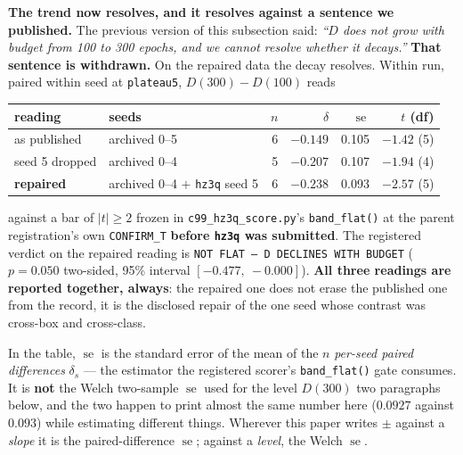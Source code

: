 \documentclass[10pt,letterpaper]{article}
\newcommand{\Dstat}{D}                         %
\newcommand{\plateau}{\texttt{plateau5}}
\newcommand{\arm}[1]{\texttt{#1}}
\DeclareMathOperator{\se}{se}
\begin{document}
\textbf{The trend now resolves, and it resolves against a sentence we published.} The previous
version of this subsection said: \emph{``$\Dstat$ does not grow with budget from 100 to 300
epochs, and we cannot resolve whether it decays.''} \textbf{That sentence is withdrawn.} On the
repaired data the decay resolves. Within run, paired within seed at \plateau{},
$\Dstat(300) - \Dstat(100)$ reads

\begin{center}
\small
\begin{tabular}{@{}llrrrr@{}}
\toprule
reading & seeds & $n$ & $\delta$ & $\se$ & $t$ (df) \\
\midrule
as published & archived 0--5 & 6 & $-0.149$ & 0.105 & $-1.42$ (5) \\
seed 5 dropped & archived 0--4 & 5 & $-0.207$ & 0.107 & $-1.94$ (4) \\
\textbf{repaired} & archived 0--4 $+$ \arm{hz3q} seed 5 & 6 & $\mathbf{-0.238}$ & 0.093 &
  $\mathbf{-2.57}$ (5) \\
\bottomrule
\end{tabular}
\end{center}

\noindent
against a bar of $|t| \ge 2$ frozen in \texttt{c99\_hz3q\_score.py}'s \texttt{band\_flat()} at the
parent registration's own \texttt{CONFIRM\_T} \textbf{before \arm{hz3q} was submitted}. The
registered verdict on the repaired reading is \texttt{NOT FLAT --- D DECLINES WITH BUDGET}
($p = 0.050$ two-sided, 95\% interval $[-0.477,\ -0.000]$). \textbf{All three readings are
reported together, always}: the repaired one does not erase the published one from the record, it
is the disclosed repair of the one seed whose contrast was cross-box and cross-class.

In the table, $\se$ is the standard error of the mean of the $n$ \emph{per-seed paired
differences} $\delta_s$ --- the estimator the registered scorer's \texttt{band\_flat()} gate
consumes. It is \textbf{not} the Welch two-sample $\se$ used for the level $\Dstat(300)$ two
paragraphs below, and the two happen to print almost the same number here ($0.0927$ against
$0.093$) while estimating different things. Wherever this paper writes $\pm$ against a
\emph{slope} it is the paired-difference $\se$; against a \emph{level}, the Welch $\se$.
\end{document}
